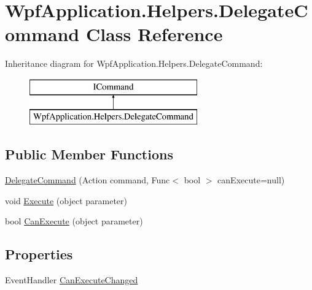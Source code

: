 \hypertarget{class_wpf_application_1_1_helpers_1_1_delegate_command}{\section{Wpf\-Application.\-Helpers.\-Delegate\-Command Class Reference}
\label{class_wpf_application_1_1_helpers_1_1_delegate_command}
}
Inheritance diagram for Wpf\-Application.\-Helpers.\-Delegate\-Command\-:\begin{figure}[H]
\begin{center}
\leavevmode
\includegraphics[height=2.000000cm]{class_wpf_application_1_1_helpers_1_1_delegate_command}
\end{center}
\end{figure}
\subsection*{Public Member Functions}
\begin{DoxyCompactItemize}
\item 
\hyperlink{class_wpf_application_1_1_helpers_1_1_delegate_command_a6bc65ddb546224275a5f98d46278b56f}{Delegate\-Command} (Action command, Func$<$ bool $>$ can\-Execute=null)
\item 
void \hyperlink{class_wpf_application_1_1_helpers_1_1_delegate_command_a21e894740c01f98e25f9d9fdda5b0d85}{Execute} (object parameter)
\item 
bool \hyperlink{class_wpf_application_1_1_helpers_1_1_delegate_command_a5be82ff4595bb5e13e4548b23d901de6}{Can\-Execute} (object parameter)
\end{DoxyCompactItemize}
\subsection*{Properties}
\begin{DoxyCompactItemize}
\item 
Event\-Handler \hyperlink{class_wpf_application_1_1_helpers_1_1_delegate_command_a92965ba61d3d0544387b3fcd6375e625}{Can\-Execute\-Changed}
\end{DoxyCompactItemize}


